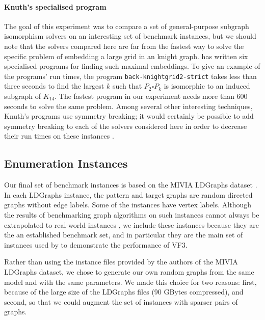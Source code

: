 \paragraph{Knuth's specialised program}
The goal of this experiment was to compare a set of general-purpose subgraph isomorphism
solvers on an interesting set of benchmark instances, but we should note that the solvers
compared here are far from the fastest way to solve the specific problem of embedding
a large grid in an knight graph.
\citet{knuth2022art} has written six specialised
programs for finding such maximal embeddings.  To give an example of the programs' run times,
the program \texttt{back-knightgrid2-strict} takes less than
three seconds to find the largest $k$ such that $P_2 \square P_k$
is isomorphic to an induced subgraph of $K_{14}$. The fastest
program in our experiment needs more than 600 seconds to solve the same problem.
Among several other interesting techniques, Knuth's programs use symmetry breaking;
it would certainly be possible to add symmetry breaking to each of the solvers considered
here in order to decrease their run times on these instances \citep{zampelli2007symmetry}.

\FloatBarrier

\subsection{Enumeration Instances}\label{subsec:si-enumeration-experiment}

Our final set of benchmark instances is based on the MIVIA LDGraphs dataset
\citep{DBLP:journals/pami/CarlettiFSV18}.  In each LDGraphs instance, the pattern and
target graphs are random directed graphs without edge labels.
Some of the instances have vertex labels.
Although the results of benchmarking graph algorithms on such instances cannot
always be extrapolated to real-world instances \citep{DBLP:conf/cp/McCreeshPST17},
we include these instances because they are the an established benchmark set,
and in particular they are the main set of instances used by \cite{DBLP:journals/pami/CarlettiFSV18}
to demonstrate the performance of VF3.

Rather than using the instance files provided by the authors of the MIVIA LDGraphs
dataset, we chose to generate our own random graphs from the same model and with the
same parameters.  We made this choice for two reasons: first, because of the large size
of the LDGraphs files (90 GBytes compressed), and second, so that we could augment
the set of instances with sparser pairs of graphs.

